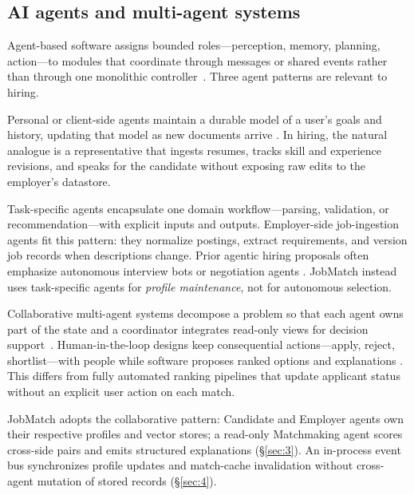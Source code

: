 \subsection{AI agents and multi-agent systems}\label{sec:2-agents}

Agent-based software assigns bounded roles---perception, memory, planning, action---to modules that coordinate through messages or shared events rather than through one monolithic controller~\cite{Wooldridge2009}.
Three agent patterns are relevant to hiring.

Personal or client-side agents maintain a durable model of a user's goals and history, updating that model as new documents arrive .
In hiring, the natural analogue is a representative that ingests resumes, tracks skill and experience revisions, and speaks for the candidate without exposing raw edits to the employer's datastore.

Task-specific agents encapsulate one domain workflow---parsing, validation, or recommendation---with explicit inputs and outputs.
Employer-side job-ingestion agents fit this pattern: they normalize postings, extract requirements, and version job records when descriptions change.
Prior agentic hiring proposals often emphasize autonomous interview bots or negotiation agents .
JobMatch instead uses task-specific agents for \emph{profile maintenance}, not for autonomous selection.

Collaborative multi-agent systems decompose a problem so that each agent owns part of the state and a coordinator integrates read-only views for decision support~\cite{Wooldridge2009}.
Human-in-the-loop designs keep consequential actions---apply, reject, shortlist---with people while software proposes ranked options and explanations .
This differs from fully automated ranking pipelines that update applicant status without an explicit user action on each match.

JobMatch adopts the collaborative pattern: Candidate and Employer agents own their respective profiles and vector stores; a read-only Matchmaking agent scores cross-side pairs and emits structured explanations (\S\ref{sec:3}).
An in-process event bus synchronizes profile updates and match-cache invalidation without cross-agent mutation of stored records (\S\ref{sec:4}).


